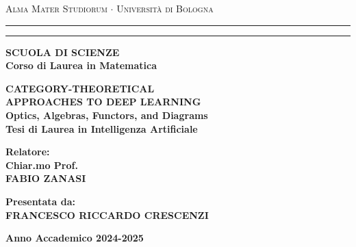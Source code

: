 ﻿\documentclass[12pt,a4paper]{report}
\begin{document}
	\begin{titlepage}
		\begin{center}
			{
				{\Large
					{\textsc{
						Alma Mater Studiorum $\cdot$ Università di Bologna
					}}
				}
			}
			\rule[0.1cm]{15.8cm}{0.1mm}
			\rule[0.5cm]{15.8cm}{0.6mm}
			{\small
				{\bf 
					SCUOLA DI SCIENZE\\
					Corso di Laurea in Matematica %
				}
			}
			\end{center}
			\vspace{15mm}
			\begin{center}
				{\LARGE{\bf CATEGORY-THEORETICAL }}\\
				\vspace{3mm}
				{\LARGE{\bf APPROACHES TO DEEP LEARNING}}\\
				\vspace{3mm}
				{\LARGE{\bf Optics, Algebras, Functors, and Diagrams}}\\
				\vspace{19mm}
				{\large
					{\bf
						Tesi di Laurea in Intelligenza Artificiale
					}
				}
			\end{center}
			\vspace{40mm}
			\par
			\noindent
			\begin{minipage}[t]{0.47\textwidth}
				{\large
					{\bf
						Relatore:\\
						Chiar.mo Prof.\\
						FABIO ZANASI
					}
				}
			\end{minipage}
			\hfill
			\begin{minipage}[t]{0.47\textwidth}\raggedleft
				{\large
					{\bf 
						Presentata da:\\
						FRANCESCO RICCARDO CRESCENZI
					}
				}
			\end{minipage}
			\vspace{30mm}
			\begin{center}
			{\large
				{\bf 
					Anno Accademico 2024-2025 %
				}
			}
		\end{center}
	\end{titlepage}
\end{document}
